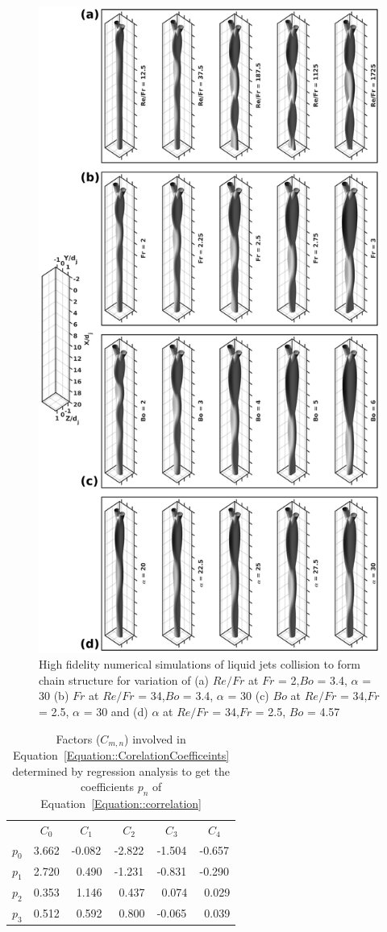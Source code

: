 \documentclass{jfm}
\begin{document}
\clearpage
\begin{figure}
	\centering
	\includegraphics[width=0.8\linewidth]{phaseContours}
	\caption{High fidelity numerical simulations of liquid jets collision to form chain structure for variation of (a) $Re/Fr$ at $Fr$ = 2,$Bo$ = 3.4, $\alpha$ = 30 (b) $Fr$ at $Re/Fr$ = 34,$Bo$ = 3.4, $\alpha$ =  30 (c) $Bo$ at $Re/Fr$ = 34,$Fr$ = 2.5, $\alpha$ = 30 and (d) $\alpha$ at $Re/Fr$ = 34,$Fr$ = 2.5, $Bo$ = 4.57}
	\label{Figure::phaseContours}
\end{figure}
\clearpage
\begin{table}
	\centering
	\begin{tabular}{@{}cccccc@{}}
		&$C_0$ & $C_1$ & $C_2$ & $C_3$ & $C_4$    \\ 
		$p_0$&3.662&-0.082&-2.822&-1.504&-0.657\\
		$p_1$&2.720&~0.490&-1.231&-0.831&-0.290\\
		$p_2$&0.353&~1.146&~0.437&~0.074&~0.029\\
		$p_3$&0.512&~0.592&~0.800&-0.065&~0.039\\ 
	\end{tabular}
	\caption{Factors ($C_{m,n}$) involved in Equation~\ref{Equation::CorelationCoefficeints} determined by regression analysis to get the coefficients $p_n$ of Equation~\ref{Equation::correlation}}
	\label{Table::CorrelationPrams}
\end{table}
\end{document}

